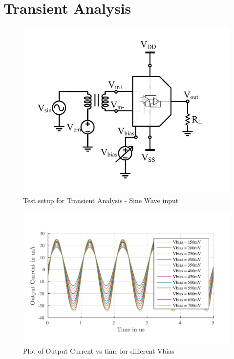 \section{Transient Analysis}
\begin{figure} [H]
\centering
\includegraphics[scale=1]{Figures/Test_Benches/Overall/SINE.pdf}
\caption{Test setup for Transient Analysis - Sine Wave input}
\end{figure}

\begin{figure} [H]
\centering
\includegraphics[scale=1]{Figures/Plots/Ov_Sine_Iout.pdf}
\caption{Plot of Output Current vs time for different Vbias}
\end{figure}

